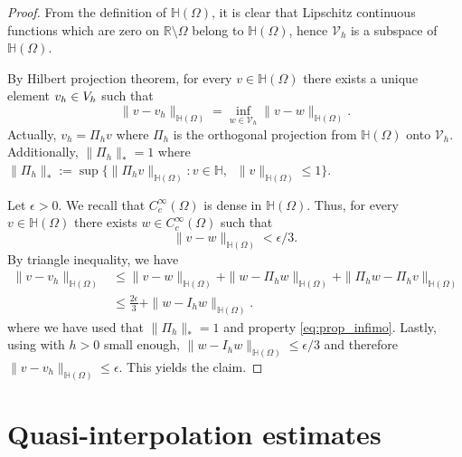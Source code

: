 \documentclass[11 pt]{article}
\numberwithin{equation}{section}
\def\R{\mathbb{R}}
\begin{document}
\begin{proof}
%
From the definition of $\mathbb H(\Omega)$, it is clear that Lipschitz continuous functions which are zero on $\R\setminus \Omega$ belong to $\mathbb H(\Omega)$, hence $\mathcal V_h$ is a subspace of $\mathbb H(\Omega)$.

By Hilbert projection theorem, for every $v\in\mathbb H(\Omega)$ there exists a unique element $v_h\in\mathcal \mathcal V_h$ such that
%
\begin{equation}\label{eq:prop_infimo}
    \|v-v_h\|_{\mathbb H(\Omega)}=\inf_{w\in\mathcal V_h}\|v-w\|_{\mathbb H(\Omega)}. 
\end{equation}
%
Actually, $v_h=\Pi_h v$ where $\Pi_h$ is the orthogonal projection from $\mathbb H(\Omega)$ onto $\mathcal V_h$. Additionally, $\|\Pi_h\|_*=1$ where $\|\Pi_h\|_*:=\sup\{\|\Pi_hv\|_{\mathbb H(\Omega)}: v\in\mathbb{H},\;\; \|v\|_{\mathbb H(\Omega)}\leq 1\}$.

Let $\epsilon>0$. We recall that $C_c^\infty(\Omega)$ is dense in $\mathbb H(\Omega)$. Thus, for every $v\in\mathbb H(\Omega)$ there exists $w\in C_c^\infty(\Omega)$ such that 
%
\begin{equation}\label{eq:density}
    \|v-w\|_{\mathbb H(\Omega)}<\epsilon/3.
\end{equation}
%
By triangle inequality, we have
%
\begin{align}
    \|v-v_h\|_{\mathbb H(\Omega)}&\leq \|v-w\|_{\mathbb H(\Omega)}+\|w-\Pi_h w\|_{\mathbb H(\Omega)}+\|\Pi_h w-\Pi_h v\|_{\mathbb H(\Omega)} \\
    &\leq \frac{2\epsilon}{3}+\|w-I_hw\|_{\mathbb H(\Omega)}. 
\end{align}
%
where we have used that $\|\Pi_h\|_*=1$ and property \eqref{eq:prop_infimo}. Lastly, using  with $h>0$ small enough, $\|w-I_hw\|_{\mathbb H(\Omega)}\leq \epsilon/3$ and therefore $\|v-v_h\|_{\mathbb H(\Omega)}\leq \epsilon$. This yields the claim.
\end{proof}


\section{Quasi-interpolation estimates}
\end{document}
